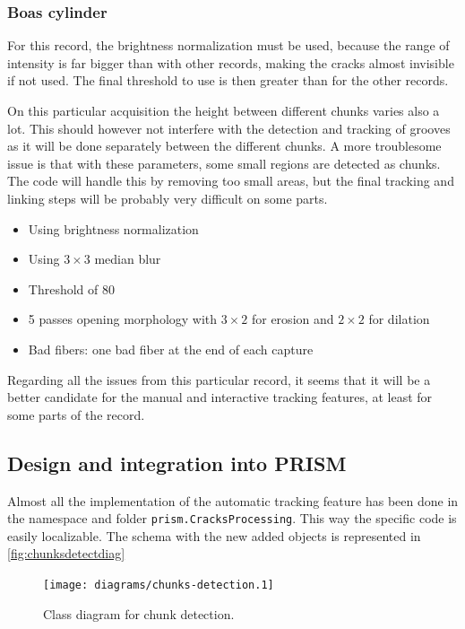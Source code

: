\subsubsection{Boas cylinder}

For this record, the brightness normalization must be used, because the range of intensity is far bigger than with other records, making the cracks almost invisible if not used. The final threshold to use is then greater than for the other records.

On this particular acquisition the height between different chunks varies also a lot. This should however not interfere with the detection and tracking of grooves as it will be done separately between the different chunks. A more troublesome issue is that with these parameters, some small regions are detected as chunks. The code will handle this by removing too small areas, but the final tracking and linking steps will be probably very difficult on some parts.

\begin{itemize}
\item Using brightness normalization
\item Using $3 \times 3$ median blur
\item Threshold of 80
\item 5 passes opening morphology with $3 \times 2$ for erosion and $2 \times 2$ for dilation
\item Bad fibers: one bad fiber at the end of each capture
\end{itemize}

Regarding all the issues from this particular record, it seems that it will be a better candidate for the manual and interactive tracking features, at least for some parts of the record.

\subsection{Design and integration into PRISM}

Almost all the implementation of the automatic tracking feature has been done in the namespace and folder \texttt{prism.CracksProcessing}. This way the specific code is easily localizable. The schema with the new added objects is represented in \autoref{fig:chunksdetectdiag}

\begin{figure}[!ht]
\centering
\texttt{[image: diagrams/chunks-detection.1]}
\caption{Class diagram for chunk detection.}
\label{fig:chunksdetectdiag}
\end{figure}

